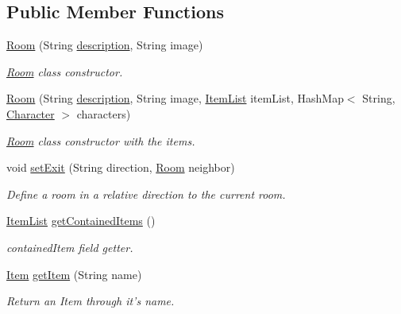 \subsection*{Public Member Functions}
\begin{DoxyCompactItemize}
\item 
\hyperlink{classpkg__world_1_1Room_ae48ca6830c8c9368ab1cb7e9b006d157}{Room} (String \hyperlink{classpkg__world_1_1Room_a029ab15b9217139d350f3a6980e49a93}{description}, String image)
\begin{DoxyCompactList}\small\item\em \hyperlink{classpkg__world_1_1Room}{Room} class constructor. \end{DoxyCompactList}\item 
\hyperlink{classpkg__world_1_1Room_abd6108f1f6d320be8d4fc1418f09d2eb}{Room} (String \hyperlink{classpkg__world_1_1Room_a029ab15b9217139d350f3a6980e49a93}{description}, String image, \hyperlink{classpkg__world_1_1pkg__items_1_1ItemList}{Item\-List} item\-List, Hash\-Map$<$ String, \hyperlink{classpkg__world_1_1pkg__characters_1_1Character}{Character} $>$ characters)
\begin{DoxyCompactList}\small\item\em \hyperlink{classpkg__world_1_1Room}{Room} class constructor with the items. \end{DoxyCompactList}\item 
void \hyperlink{classpkg__world_1_1Room_a4a97591f3b574b3d0086843a919a0214}{set\-Exit} (String direction, \hyperlink{classpkg__world_1_1Room}{Room} neighbor)
\begin{DoxyCompactList}\small\item\em Define a room in a relative direction to the current room. \end{DoxyCompactList}\item 
\hyperlink{classpkg__world_1_1pkg__items_1_1ItemList}{Item\-List} \hyperlink{classpkg__world_1_1Room_a969205a4d2d2d9e30d1e1db9fc3f0b43}{get\-Contained\-Items} ()
\begin{DoxyCompactList}\small\item\em contained\-Item field getter. \end{DoxyCompactList}\item 
\hyperlink{classpkg__world_1_1pkg__items_1_1Item}{Item} \hyperlink{classpkg__world_1_1Room_a8624c98bd006830d4484dae2dcd8c8e7}{get\-Item} (String name)
\begin{DoxyCompactList}\small\item\em Return an Item through it's name. \end{DoxyCompactList}\item 

\end{DoxyCompactItemize}
